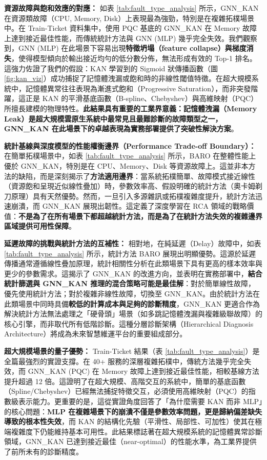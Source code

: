 \documentclass[10pt,a4paper,twocolumn]{article}
\begin{document}
\textbf{資源故障與飽和效應的對應：} 如表 \ref{tab:fault_type_analysis} 所示，GNN\_KAN 在資源類故障（CPU, Memory, Disk）上表現最為強勁，特別是在複雜拓樸場景中。在 Train-Ticket 資料集中，使用 PQC 基底的 GNN\_KAN 在 Memory 故障上達到接近最佳性能，而傳統統計方法與 GNN (MLP) 幾乎完全失效。我們觀察到，GNN (MLP) 在此場景下容易出現\textbf{特徵坍塌（feature collapse）與梯度消失}，使得模型傾向於輸出接近均勻的低分數分佈，無法形成有效的 Top-1 排名。這強力佐證了我們的假設：KAN 學習到的 Sigmoid 狀傳播函數（圖 \ref{fig:kan_viz}）成功捕捉了記憶體洩漏或飽和時的非線性閾值特徵。在超大規模系統中，記憶體異常往往表現為漸進式飽和（Progressive Saturation），而非突發階躍，這正是 KAN 的平滑基底函數（B-spline、Chebyshev）與高維映射（PQC）所擅長建模的物理特性。\textbf{此結果具有重要的工業界意義：記憶體洩漏（Memory Leak）是超大規模雲原生系統中最常見且最難診斷的故障類型之一，GNN\_KAN 在此場景下的卓越表現為實務部署提供了突破性解決方案}。

\textbf{統計基線與深度模型的性能權衡邊界（Performance Trade-off Boundary）：} 在簡單拓樸場景中，如表 \ref{tab:fault_type_analysis} 所示，BARO 在整體性能上優於 GNN\_KAN，特別是在 CPU、Memory、Disk 等資源故障上。這並非本方法的缺陷，而是深刻揭示了\textbf{方法適用邊界}：當系統拓樸簡單、故障模式接近線性（資源飽和呈現近似線性疊加）時，參數效率高、假設明確的統計方法（奧卡姆剃刀原理）具有天然優勢。然而，一旦引入多源雜訊或拓樸複雜度提升，統計方法迅速崩潰，而 GNN\_KAN 展現出韌性。這定義了深度學習在 RCA 領域的戰略價值：\textbf{不是為了在所有場景下都超越統計方法，而是為了在統計方法失效的複雜邊界區域提供可用性保障}。

\textbf{延遲故障的挑戰與統計方法的互補性：} 相對地，在純延遲（Delay）故障中，如表 \ref{tab:fault_type_analysis} 所示，統計方法 BARO 展現出明顯優勢。這源於延遲傳播通常遵循線性疊加原理，統計相關性分析在此類場景下具有更高的樣本效率與更少的參數需求。這揭示了 GNN\_KAN 的改進方向，並表明在實務部署中，\textbf{結合統計篩選與 GNN\_KAN 推理的混合策略可能是最佳解}：對於簡單線性故障，優先使用統計方法；對於複雜非線性故障，切換至 GNN\_KAN。由於統計方法在此類場景中同時具備\textbf{較低的計算成本與足夠的診斷精度}，GNN\_KAN 更適合作為解決統計方法無法處理之「硬骨頭」場景（如多跳記憶體洩漏與複雜級聯故障）的核心引擎，而非取代所有低階診斷。這種分層診斷架構（Hierarchical Diagnosis Architecture）將成為未來智慧維運平台的重要組成部分。

\textbf{超大規模場景的量子優勢：} Train-Ticket 結果（表 \ref{tab:fault_type_analysis}）是全篇最強烈的實證支撐。在 40+ 服務的深層複雜拓樸中，傳統方法幾乎完全失效，而 GNN\_KAN (PQC) 在 Memory 故障上達到接近最佳性能，相較基線方法提升超過 12 倍。這證明了在超大規模、高階交互的系統中，簡單的基底函數（Spline/Chebyshev）已經無法捕捉特徵交互，必須使用高維映射（PQC）的指數級表示能力。更重要的是，這從實證角度回答了「為什麼需要 KAN 而非 MLP」的核心問題：\textbf{MLP 在複雜場景下的崩潰不僅是參數效率問題，更是歸納偏差缺失導致的根本性失效}，而 KAN 的結構化先驗（平滑性、局部性、可加性）使其在極端複雜度下仍能維持基本可用性。此結果標誌著在超大規模系統的記憶體異常診斷領域，GNN\_KAN 已達到接近最佳（near-optimal）的性能水準，為工業界提供了前所未有的診斷精度。
\end{document}
